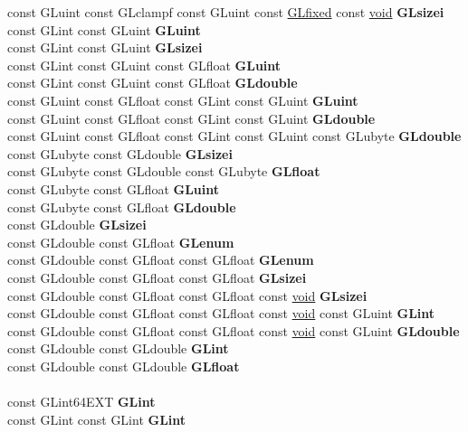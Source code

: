 \begin{DoxyCompactItemize}
\begin{tabbing}
\>const GLuint const GLclampf const GLuint const \hyperlink{glheader_8h_ad6d3fa892df40dedf48ee6d84529ae5e}{GLfixed} const \hyperlink{interfacevoid}{void} {\bfseries GLsizei}\\
\>const GLint const GLuint {\bfseries GLuint}\\
\>const GLint const GLuint {\bfseries GLsizei}\\
\>const GLint const GLuint const GLfloat {\bfseries GLuint}\\
\>const GLint const GLuint const GLfloat {\bfseries GLdouble}\\
\>const GLuint const GLfloat const GLint const GLuint {\bfseries GLuint}\\
\>const GLuint const GLfloat const GLint const GLuint {\bfseries GLdouble}\\
\>const GLuint const GLfloat const GLint const GLuint const GLubyte {\bfseries GLdouble}\\
\>const GLubyte const GLdouble {\bfseries GLsizei}\\
\>const GLubyte const GLdouble const GLubyte {\bfseries GLfloat}\\
\>const GLubyte const GLfloat {\bfseries GLuint}\\
\>const GLubyte const GLfloat {\bfseries GLdouble}\\
\>const GLdouble {\bfseries GLsizei}\\
\>const GLdouble const GLfloat {\bfseries GLenum}\\
\>const GLdouble const GLfloat const GLfloat {\bfseries GLenum}\\
\>const GLdouble const GLfloat const GLfloat {\bfseries GLsizei}\\
\>const GLdouble const GLfloat const GLfloat const \hyperlink{interfacevoid}{void} {\bfseries GLsizei}\\
\>const GLdouble const GLfloat const GLfloat const \hyperlink{interfacevoid}{void} const GLuint {\bfseries GLint}\\
\>const GLdouble const GLfloat const GLfloat const \hyperlink{interfacevoid}{void} const GLuint {\bfseries GLdouble}\\
\>const GLdouble const GLdouble {\bfseries GLint}\\
\>const GLdouble const GLdouble {\bfseries GLfloat}\\
\\
\>const GLint64EXT {\bfseries GLint}\\
\>const GLint const GLint {\bfseries GLint}\\

\end{tabbing}
\end{DoxyCompactItemize}
